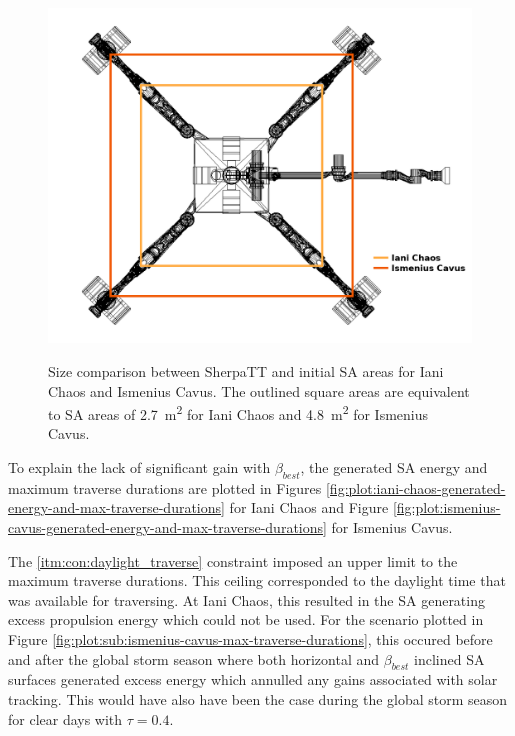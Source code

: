 \clearpage
\begin{figure}[h]
  \captionsetup[subfigure]{justification=centering}
  \centering
  \hypersetup{linkcolor=captionTextColor}
  \includegraphics[width=0.8\linewidth]{sections/design/solar-array/images/sa-area-initial-sizes.png}\\
  \caption[Size comparison between SherpaTT and initial SA areas for Iani Chaos and Ismenius Cavus]
          {Size comparison between SherpaTT and initial \ac{SA} areas for Iani Chaos and Ismenius Cavus. The outlined square areas are equivalent to \ac{SA} areas of \SI{2.7}{m^{2}} for Iani Chaos and \SI{4.8}{m^{2}} for Ismenius Cavus.}
  \label{fig:sa-area-initial-sizes}
\end{figure}

To explain the lack of significant gain with $\beta_{best}$, the generated \ac{SA} energy and maximum traverse durations are plotted in Figures \ref{fig:plot:iani-chaos-generated-energy-and-max-traverse-durations} for Iani Chaos and Figure \ref{fig:plot:ismenius-cavus-generated-energy-and-max-traverse-durations} for Ismenius Cavus.

The \ref{itm:con:daylight_traverse} constraint imposed an upper limit to the maximum traverse durations. This ceiling corresponded to the daylight time that was available for traversing. At Iani Chaos, this resulted in the \ac{SA} generating excess propulsion energy which could not be used. For the scenario plotted in Figure \ref{fig:plot:sub:ismenius-cavus-max-traverse-durations}, this occured before and after the global storm season where both horizontal and $\beta_{best}$ inclined \ac{SA} surfaces generated excess energy which annulled any gains associated with solar tracking. This would have also have been the case during the global storm season for clear days with $\tau = 0.4$.

